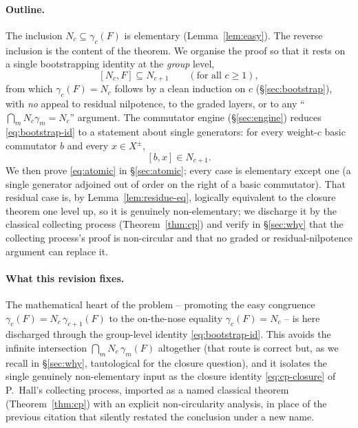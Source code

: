 \documentclass{amsart}
\theoremstyle{definition}
\theoremstyle{remark}
\begin{document}
\paragraph{Outline.}
The inclusion $N_c\subseteq\gamma_c(F)$ is elementary
(Lemma~\ref{lem:easy}). The reverse inclusion is the content of the theorem. We
organise the proof so that it rests on a single bootstrapping identity at the
\emph{group} level,
\begin{equation}\label{eq:bootstrap-id}
[N_c,F]\subseteq N_{c+1}\qquad(\text{for all }c\ge1),
\end{equation}
from which $\gamma_c(F)=N_c$ follows by a clean induction on $c$
(\S\ref{sec:bootstrap}), with \emph{no} appeal to residual nilpotence, to the
graded layers, or to any ``$\bigcap_m N_c\gamma_m=N_c$'' argument. The commutator
engine (\S\ref{sec:engine}) reduces \eqref{eq:bootstrap-id} to a statement about
single generators: for every weight-$c$ basic commutator $b$ and every
$x\in X^{\pm}$,
\begin{equation}\label{eq:atomic}
[b,x]\in N_{c+1}.
\end{equation}
We then prove \eqref{eq:atomic} in \S\ref{sec:atomic}; every case is elementary
except one (a single generator adjoined out of order on the right of a basic
commutator). That residual case is, by Lemma~\ref{lem:residue-eq}, logically
equivalent to the closure theorem one level up, so it is genuinely non-elementary;
we discharge it by the classical collecting process (Theorem~\ref{thm:cp}) and
verify in \S\ref{sec:why} that the collecting process's proof is non-circular and
that no graded or residual-nilpotence argument can replace it.

\paragraph{What this revision fixes.}
The mathematical heart of the problem -- promoting the easy congruence
$\gamma_c(F)=N_c\,\gamma_{c+1}(F)$ to the on-the-nose equality $\gamma_c(F)=N_c$
-- is here discharged through the group-level identity \eqref{eq:bootstrap-id}.
This avoids the infinite intersection $\bigcap_m N_c\,\gamma_m(F)$ altogether
(that route is correct but, as we recall in \S\ref{sec:why}, tautological for the
closure question), and it isolates the single genuinely non-elementary input as the closure
identity \eqref{eq:cp-closure} of P.~Hall's collecting process, imported as a
named classical theorem (Theorem~\ref{thm:cp}) with an explicit non-circularity
analysis, in place of the previous citation that silently restated the conclusion
under a new name.
\end{document}
